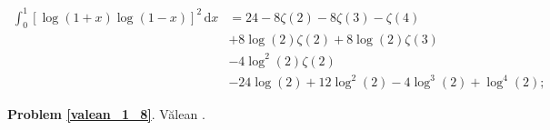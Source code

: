 %

\begin{problem_with_solution}[]
    \label{valean_1_8}%
    \begin{align}
        \int_0^1 [\log(1+x) \log(1-x)]^2 \,\mathrm{d} x & =
        24 - 8 \zeta(2)- 8 \zeta(3) - \zeta(4) \\
        & + 8 \log(2)\zeta(2) + 8 \log(2)\zeta(3) \\
        & - 4 \log^2(2)\zeta(2) \\
        & - 24 \log(2) + 12 \log^2(2)- 4 \log^3(2) + \log^4(2); 
    \end{align}
\end{problem_with_solution}


\textbf{Problem \ref{valean_1_8}}.
Vălean \cite[s. 4, 5]{nahin15}.



%